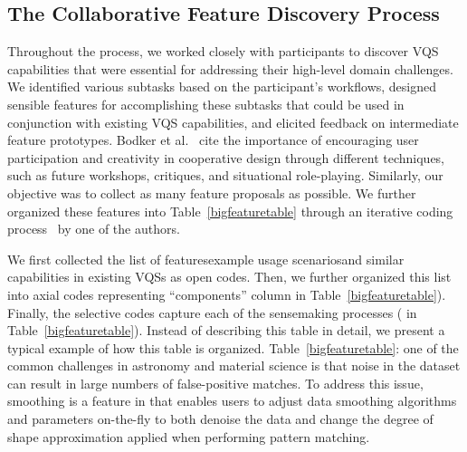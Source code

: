  \subsection{The Collaborative Feature Discovery Process~\label{sec:feature_dsicovery}}
 \par Throughout the  process, we worked closely with participants to discover VQS capabilities that were essential for addressing their high-level domain challenges. We identified various subtasks based on the participant's workflows, designed sensible features for accomplishing these subtasks that could be used in conjunction with existing VQS capabilities, and elicited feedback on intermediate feature prototypes. Bodker et al.~\cite{BodkerGronbaek} cite the importance of encouraging user participation and creativity in cooperative design through different techniques, such as future workshops, critiques, and situational role-playing. Similarly, our objective was to collect as many feature proposals as possible. We further organized these features  into Table~\ref{bigfeaturetable} through an iterative coding process~\cite{Muller2012} by one of the authors.
 \par {} We first collected the list of features\rchange{, }example usage scenarios\rchange{, }and similar capabilities in existing VQSs as open codes. Then, we further organized this list into axial codes representing ``components'' column in Table~\ref{bigfeaturetable}). Finally, the selective codes capture each of the sensemaking processes ( in Table~\ref{bigfeaturetable}). Instead of describing this table in detail, we present a typical example of how this table is organized.  Table~\ref{bigfeaturetable}: one of the common challenges in astronomy and material science is that noise in the dataset can result in large numbers of false-positive matches. To address this issue, smoothing is a feature in \zvpp that enables users to adjust data smoothing algorithms and parameters on-the-fly to both denoise the data and change the degree of shape approximation applied when performing pattern matching. %
